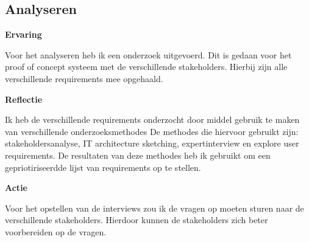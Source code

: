 \subsection{Analyseren}

\textbf{Ervaring}

\whitespace
Voor het analyseren heb ik een onderzoek uitgevoerd.
Dit is gedaan voor het proof of concept systeem met de verschillende stakeholders.
Hierbij zijn alle verschillende requirements mee opgehaald.

\whitespace
\textbf{Reflectie}

\whitespace
Ik heb de verschillende requirements onderzocht door middel gebruik te maken van verschillende onderzoeksmethodes
De methodes die hiervoor gebruikt zijn: stakeholdersanalyse, IT architecture sketching, expertinterview en explore user requirements.
De resultaten van deze methodes heb ik gebruikt om een gepriotiriseerdde lijst van requirements op te stellen.

\whitespace
\textbf{Actie}

\whitespace
Voor het opstellen van de interviews zou ik de vragen op moeten sturen naar de verschillende stakeholders.
Hierdoor kunnen de stakeholders zich beter voorbereiden op de vragen.

